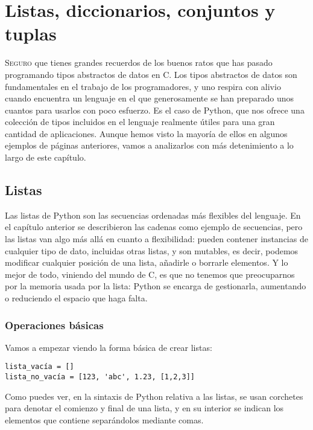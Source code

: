 
\chapter{Listas, diccionarios, conjuntos y tuplas}

\lettrine[lines=5]{S}{eguro} que tienes grandes recuerdos de los buenos ratos que has pasado programando tipos abstractos de datos en C. Los tipos abstractos de datos son fundamentales en el trabajo de los programadores, y uno respira con alivio cuando encuentra un lenguaje en el que generosamente se han preparado unos cuantos para usarlos con poco esfuerzo. Es el caso de Python, que nos ofrece una colección de tipos incluidos en el lenguaje realmente útiles para una gran cantidad de aplicaciones. Aunque hemos visto la mayoría de ellos en algunos ejemplos de páginas anteriores, vamos a analizarlos con más detenimiento a lo largo de este capítulo.

\section{Listas}\label{sec:listas}

Las listas de Python son las secuencias ordenadas más flexibles del lenguaje. En el capítulo anterior se describieron las cadenas como ejemplo de secuencias, pero las listas van algo más allá en cuanto a flexibilidad: pueden contener instancias de cualquier tipo de dato, incluidas otras listas, y son mutables, es decir, podemos modificar cualquier posición de una lista, añadirle o borrarle elementos. Y lo mejor de todo, viniendo del mundo de C, es que no tenemos que preocuparnos por la memoria usada por la lista: Python se encarga de gestionarla, aumentando o reduciendo el espacio que haga falta.

\subsection{Operaciones básicas}

Vamos a empezar viendo la forma básica de crear listas:

\begin{lstlisting}
lista_vacía = []
lista_no_vacía = [123, 'abc', 1.23, [1,2,3]]
\end{lstlisting}

Como puedes ver, en la sintaxis de Python relativa a las listas, se usan corchetes para denotar el comienzo y final de una lista, y en su interior se indican los elementos que contiene separándolos mediante comas. 

